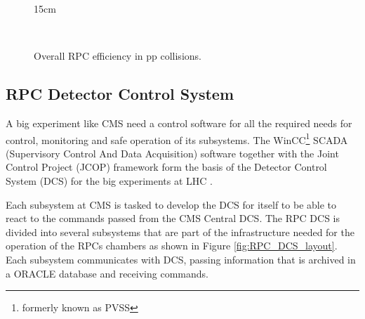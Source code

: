 \begin{figure}[!htm]{15cm}
  \caption{Overall RPC efficiency in pp collisions.} 
  \label{fig:overallefficiency2018vs2022}
  \hfill
  \\
\end{figure}

\subsection{RPC Detector Control System}

A big experiment like CMS need a control software for all the required needs for control, monitoring and safe operation of its subsystems. The WinCC\footnote{formerly known as PVSS} SCADA (Supervisory Control And Data Acquisition) software together with the Joint Control Project (JCOP) framework form the basis of the Detector Control System (DCS) for the big experiments at LHC \cite{Arcidiacono:2005fr}. 

Each subsystem at CMS is tasked to develop the DCS for itself to be able to react to the commands passed from the CMS Central DCS. The RPC DCS is divided into several subsystems that are part of the infrastructure needed for the operation of the RPCs chambers as shown in Figure \ref{fig:RPC_DCS_layout}. Each subsystem communicates with DCS, passing information that is archived in a ORACLE database and receiving commands.


